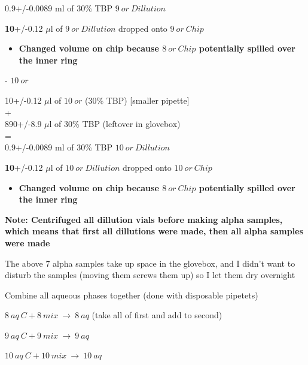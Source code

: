 \documentclass[idxtotoc,hyperref,openany,oneside]{labbook} %
\newcommand{\cmark}{\ding{51}}%
\newcommand{\done}{\rlap{$\square$}{\raisebox{2pt}{\large\hspace{1pt}\cmark}}%
  \hspace{-2.5pt}}
\begin{document}
\begin{todolist}
\begin{center}
0.9+/-0.0089 ml of 30\% TBP $\boxed{9\ or\ Dillution}$
\end{center}
\vspace{0.3cm}
\begin{center}
  \textbf{10}+/-0.12 $\mu$l of $\boxed{9\ or\ Dillution}$ dropped onto
  $\boxed{9\ or\ Chip}$
\end{center}
\begin{itemize}
\item{\textbf{Changed volume on chip because $\boxed{8\ or\ Chip}$
    potentially spilled over the inner ring}}
\end{itemize}
\begin{todolist}
\item[\done]{- $\boxed{10\ or}$}
\end{todolist}
\begin{center}
10+/-0.12 $\mu$l of $\boxed{10\ or}$ (30\% TBP) [smaller pipette]\\
+\\
890+/-8.9 $\mu$l of 30\% TBP (leftover in glovebox)\\
=\\
0.9+/-0.0089 ml of 30\% TBP $\boxed{10\ or\ Dillution}$
\end{center}
\vspace{0.3cm}
\begin{center}
  \textbf{10}+/-0.12 $\mu$l of $\boxed{10\ or\ Dillution}$ dropped onto
  $\boxed{10\ or\ Chip}$
\end{center}
\begin{itemize}
\item{\textbf{Changed volume on chip because $\boxed{8\ or\ Chip}$
    potentially spilled over the inner ring}}
\end{itemize}
\item[\done]{\textbf{Note: Centrifuged all dillution vials before making
    alpha samples, which means that first all dillutions were made,
    then all alpha samples were made}}
\item[\done]{The above 7 alpha samples take up space in the
  glovebox, and I didn't want to disturb the samples (moving them
  screws them up) so I let them dry overnight}
\end{todolist}


\begin{todolist}
\item[\done]{Combine all aqueous phases together (done with disposable
pipetets)}
  \begin{todolist}
  \item[\done]{$\boxed{8\ aq\ C}+\boxed{8\ mix}\ \rightarrow\ \boxed{8\ aq}$
    (take all of first and add to second)}
  \item[\done]{$\boxed{9\ aq\ C}+\boxed{9\ mix}\ \rightarrow\ \boxed{9\ aq}$}
  \item[\done]{$\boxed{10\ aq\ C}+\boxed{10\ mix}\ \rightarrow\ \boxed{10\ aq}$}
  \end{todolist}
\end{todolist}
\end{document}
